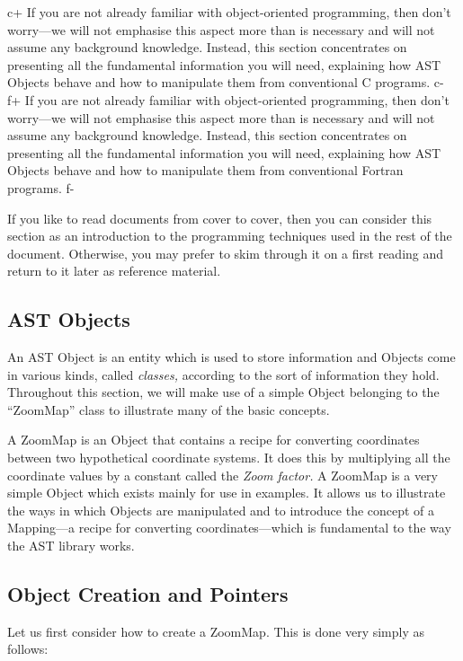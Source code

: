 \documentclass[twoside,11pt]{article}
\begin{document}
c+
If you are not already familiar with object-oriented programming, then
don't worry---we will not emphasise this aspect more than is necessary
and will not assume any background knowledge.  Instead, this section
concentrates on presenting all the fundamental information you will
need, explaining how AST Objects behave and how to manipulate them
from conventional C programs.
c-
f+
If you are not already familiar with object-oriented programming, then
don't worry---we will not emphasise this aspect more than is necessary
and will not assume any background knowledge.  Instead, this section
concentrates on presenting all the fundamental information you will
need, explaining how AST Objects behave and how to manipulate them
from conventional Fortran programs.
f-

If you like to read documents from cover to cover, then you can
consider this section as an introduction to the programming techniques
used in the rest of the document. Otherwise, you may prefer to skim
through it on a first reading and return to it later as reference
material.

\subsection{AST Objects}

An AST Object is an entity which is used to store information and
Objects come in various kinds, called {\em{classes,}} according to the
sort of information they hold. Throughout this section, we will make
use of a simple Object belonging to the ``ZoomMap'' class to
illustrate many of the basic concepts.

A ZoomMap is an Object that contains a recipe for converting
coordinates between two hypothetical coordinate systems.  It does this
by multiplying all the coordinate values by a constant called the
{\em{Zoom factor.}}  A ZoomMap is a very simple Object which exists
mainly for use in examples. It allows us to illustrate the ways in
which Objects are manipulated and to introduce the concept of a
Mapping---a recipe for converting coordinates---which is fundamental
to the way the AST library works.

\subsection{\label{ss:objectcreation}Object Creation and Pointers}

Let us first consider how to create a ZoomMap. This is done very
simply as follows:
\end{document}
